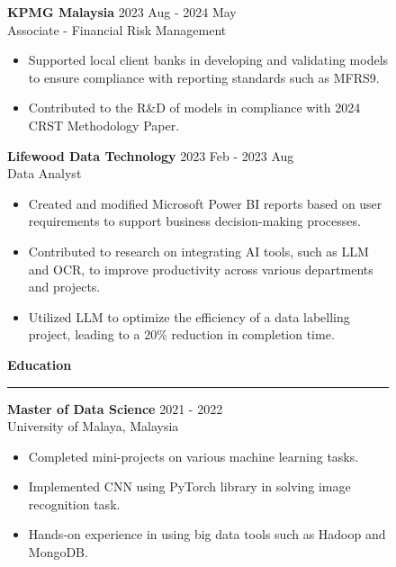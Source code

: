\documentclass[a4paper, 10pt]{article}
\newcommand{\rhsWidth}{0.65\textwidth}
\newenvironment{expSection}[3]{%
    \textbf{#1} \hfill {#2} \\
    #3
	\vspace{-6pt}
}{}
\begin{document}
\begin{figure}[h]
\begin{minipage}[t]{\rhsWidth}
	\begin{expSection} {KPMG Malaysia} {2023 Aug - 2024 May} {Associate - Financial Risk Management}
		\begin{itemize} [itemsep = 0pt, parsep=2pt]
			\item Supported local client banks in developing and validating models to ensure compliance with reporting standards such as MFRS9.
			\item Contributed to the R\&D of models in compliance with 2024 CRST Methodology Paper.
		\end{itemize}
	\end{expSection}

	\begin{expSection} {Lifewood Data Technology} {2023 Feb - 2023 Aug} {Data Analyst}
		\begin{itemize} [itemsep = 0pt, parsep=2pt]
			\item Created and modified Microsoft Power BI reports based on user requirements to support business decision-making processes.
			\item Contributed to research on integrating AI tools, such as LLM and OCR, to improve productivity across various departments and projects.
			\item Utilized LLM to optimize the efficiency of a data labelling project, leading to a 20\% reduction in completion time.
		\end{itemize}
	\end{expSection}

	\vspace{1.0em}
	
	{\Large \faGraduationCap \hspace{3pt} \textbf{Education}} \newline
	\rule [6pt]{\linewidth}{1pt}
	\vspace{-15pt}
	
	\begin{expSection} {Master of Data Science} {2021 - 2022} {University of Malaya, Malaysia}
		\begin{itemize} [itemsep = 0pt, parsep=2pt]
			\item Completed mini-projects on various machine learning tasks.
			\item Implemented CNN using PyTorch library in solving image recognition task.
			\item Hands-on experience in using big data tools such as Hadoop and MongoDB.
		\end{itemize}
	\end{expSection}
	

\end{minipage}
\end{figure}
\end{document}
